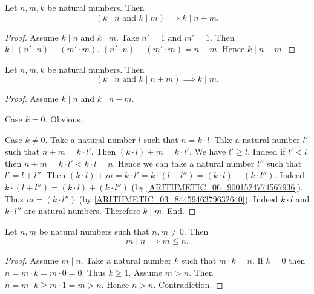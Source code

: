 \documentclass[10pt]{article}
\begin{document}
  \begin{forthel}
    \begin{corollary}
      Let $n, m, k$ be natural numbers.
      Then \[ (\text{$k \mid n$ and $k \mid m$}) \implies k \mid n + m. \]
    \end{corollary}
    \begin{proof}
      Assume $k \mid n$ and $k \mid m$.
      Take $n' = 1$ and $m' = 1$.
      Then $k \mid (n' \cdot n) + (m' \cdot m)$.
      $(n' \cdot n) + (m' \cdot m) = n + m$.
      Hence $k \mid n + m$.
    \end{proof}
  \end{forthel}

  \begin{forthel}
    \begin{proposition}
      Let $n, m, k$ be natural numbers.
      Then \[ (\text{$k \mid n$ and $k \mid n + m$}) \implies k \mid m. \]
    \end{proposition}
    \begin{proof}
      Assume $k \mid n$ and $k \mid n + m$.

      Case $k = 0$. Obvious.

      Case $k \neq 0$.
        Take a natural number $l$ such that $n = k \cdot l$.
        Take a natural number $l'$ such that $n + m = k \cdot l'$.
        Then $(k \cdot l) + m = k \cdot l'$.
        We have $l' \geq l$.
        Indeed if $l' < l$ then
        $n + m
          = k \cdot l'
          < k \cdot l
          = n$.
        Hence we can take a natural number $l''$ such that $l' = l + l''$.
        Then $(k \cdot l) + m
          = k \cdot l'
          = k \cdot (l + l'')
          = (k \cdot l) + (k \cdot l'')$.
        Indeed $k \cdot (l + l'') = (k \cdot l) + (k \cdot l'')$
        (by \cref{ARITHMETIC_06_9001524774567936}).
        Thus $m = (k \cdot l'')$ (by \cref{ARITHMETIC_03_8445946379632640}).
        Indeed $k \cdot l$ and $k \cdot l''$ are natural numbers.
        Therefore $k \mid m$.
      End.
    \end{proof}
  \end{forthel}

  \begin{forthel}
    \begin{proposition}
      Let $n, m$ be natural numbers such that $n, m \neq 0$.
      Then \[ m \mid n \implies m \leq n. \]
    \end{proposition}
    \begin{proof}
      Assume $m \mid n$.
      Take a natural number $k$ such that $m \cdot k = n$.
      If $k = 0$ then
      $n
        = m \cdot k
        = m \cdot 0
        = 0$.
      Thus $k \geq 1$.
      Assume $m > n$.
      Then $n
        = m \cdot k
        \geq m \cdot 1
        = m
        > n$.
      Hence $n > n$.
      Contradiction.
    \end{proof}
  \end{forthel}
\end{document}
